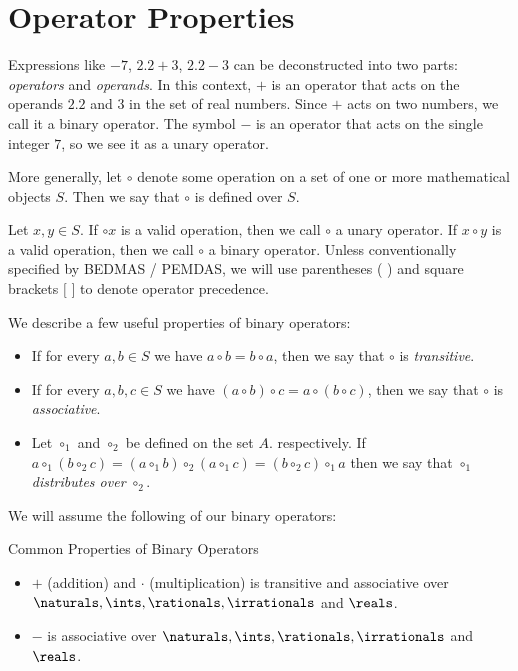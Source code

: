 \newcommand{\op}{\circ}
\newcommand{\ftoperandfn}{Operators can be thought of as shorthand for
functions. For example, the $-$ operator is shorthand to the function
$n(x) = -x$, and $+$ is a shorthand for $a(x, y) = x + y$.}

\newcommand{\ftoperanddist}{It is not always the case that
$a \op_1 (b \op_2 c) = (b \op_2 c) \op_1 a$. If we need to make a distinction
between the two forms, we will refer to the left form as left distributivity,
and the right form as right distributivity.}

\section{Operator Properties}
Expressions like $-7$, $2.2 + 3$, $2.2 - 3$ can be deconstructed into two
parts: \emph{operators} and \emph{operands}. In this context, $+$ is an
operator that acts on the operands $2.2$ and $3$ in the set of real numbers.
Since $+$ acts on two numbers, we call it a binary operator. The symbol $-$ is
an operator that acts on the single integer $7$, so we see it as a unary
operator.

More generally, let $\op$ denote some operation on a set of one or more
mathematical objects $S$. Then we say that $\op$ is defined over $S$.

Let $x, y \in S$.
If $\op x$ is a valid operation, then we call $\op$ a unary operator. If
$x \op y$ is a valid operation, then we call $\op$ a binary operator.
Unless conventionally specified by BEDMAS / PEMDAS, we will use parentheses ( )
and square brackets $[$ {} $]$ to denote operator precedence.

We describe a few useful properties of binary operators:
\begin{itemize}
  \item If for every $a, b \in S$ we have $a \op b = b \op a$, then we say
  that $\op$ is \emph{transitive}.
  \item If for every $a, b, c \in S$ we have $(a \op b) \op c =
  a \op (b \op c)$, then we say that $\op$ is \emph{associative}.
  \item Let $\op_1$ and $\op_2$ be defined on the set $A$.
  respectively. If $a \op_1 (b \op_2 c) = (a \op_1 b) \op_2 (a \op_1 c) =
  (b \op_2 c) \op_1 a$ then we say that $\op_1$ \emph{distributes over}
  $\op_2$.
\end{itemize}

We will assume the following of our binary operators:
\begin{prop}
  Common Properties of Binary Operators
\end{prop}
\begin{itemize}
  \item $+$ (addition) and $\cdot$ (multiplication) is transitive and
   associative over $\naturals, \ints, \rationals, \irrationals$ and $\reals$.
  \item $-$ is associative over $\naturals, \ints, \rationals, \irrationals$
   and $\reals$.
\end{itemize}

